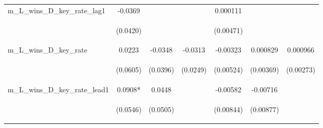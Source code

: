 \documentclass[]{article}
\begin{document}
\begin{center}
\begin{tabular}{lcccccc}
m\_L\_wins\_D\_key\_rate\_lag1 & -0.0369 &  &  & 0.000111 &  &  \\
\vspace{4pt} & \begin{footnotesize}(0.0420)\end{footnotesize} & \begin{footnotesize}\end{footnotesize} & \begin{footnotesize}\end{footnotesize} & \begin{footnotesize}(0.00471)\end{footnotesize} & \begin{footnotesize}\end{footnotesize} & \begin{footnotesize}\end{footnotesize} \\
m\_L\_wins\_D\_key\_rate & 0.0223 & -0.0348 & -0.0313 & -0.00323 & 0.000829 & 0.000966 \\
\vspace{4pt} & \begin{footnotesize}(0.0605)\end{footnotesize} & \begin{footnotesize}(0.0396)\end{footnotesize} & \begin{footnotesize}(0.0249)\end{footnotesize} & \begin{footnotesize}(0.00524)\end{footnotesize} & \begin{footnotesize}(0.00369)\end{footnotesize} & \begin{footnotesize}(0.00273)\end{footnotesize} \\
m\_L\_wins\_D\_key\_rate\_lead1 & 0.0908* & 0.0448 &  & -0.00582 & -0.00716 &  \\
\vspace{4pt} & \begin{footnotesize}(0.0546)\end{footnotesize} & \begin{footnotesize}(0.0505)\end{footnotesize} & \begin{footnotesize}\end{footnotesize} & \begin{footnotesize}(0.00844)\end{footnotesize} & \begin{footnotesize}(0.00877)\end{footnotesize} & \begin{footnotesize}\end{footnotesize} \\

\end{tabular}
\end{center}
\end{document}
